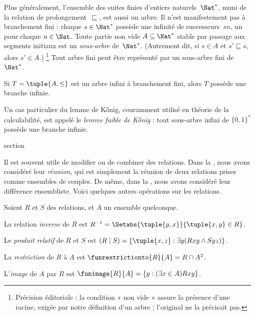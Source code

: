 \documentclass[11pt,a4paper,openany]{memoir}
\begin{document}
\begin{ex}
Plus généralement, l’ensemble des suites finies d’entiers naturels~$\Nat^*$,
muni de la relation de prolongement~$\sqsubseteq$, est aussi un arbre.
Il n’est manifestement pas à branchement fini : chaque $s \in \Nat^*$
possède une infinité de successeurs~$sn$, un pour chaque $n \in \Nat$.
Toute partie non vide $A \subseteq \Nat^*$ stable par passage aux
segments initiaux est un \emph{sous-arbre} de~$\Nat^*$.
(Autrement dit, si $s \in A$ et $s' \sqsubseteq s$, alors $s' \in A$.)
\footnote{Précision éditoriale : la condition « non vide » assure la
présence d’une racine, exigée par notre définition d’un arbre ;
l’original ne la précisait pas.}
Tout arbre fini peut être représenté par un sous-arbre fini de~$\Nat^*$.
\end{ex}

\begin{prop}
Si $T = \tuple{A,\le}$ est un arbre infini à branchement fini,
alors $T$ possède une branche infinie.
\end{prop}

Un cas particulier du lemme de K\H{o}nig, couramment utilisé en théorie
de la calculabilité, est appelé le \emph{lemme faible de K\H{o}nig} :
tout sous-arbre infini de $\{0,1\}^*$ possède une branche infinie.


\endgroup



\begingroup
\expandafter\def\csname ol@sectioncs\endcsname{section}
\def\olfilename{operations}



Il est souvent utile de modifier ou de combiner des relations.
Dans la , nous avons considéré
leur \emph{réunion}, qui est simplement la réunion de deux relations
prises comme ensembles de couples. De même, dans la
, nous avons considéré
leur différence ensembliste. Voici quelques autres opérations sur les relations.

\begin{defn}
Soient $R$ et $S$ des relations, et $A$ un ensemble quelconque.

La relation \emph{inverse} de $R$ est
$R^{-1} = \Setabs{\tuple{y, x}}{\tuple{x, y} \in R}$.

Le \emph{produit relatif} de $R$ et $S$ est
$(R \mid S) = \{\tuple{x, z} : \exists y(Rxy \land Syz)\}$.

La \emph{restriction} de $R$ à $A$ est
$\funrestrictionto{R}{A}= R \cap A^2$.

L’\emph{image} de $A$ par $R$ est
$\funimage{R}{A} = \{y : (\exists x \in A)Rxy\}$.
\end{defn}
\end{document}
